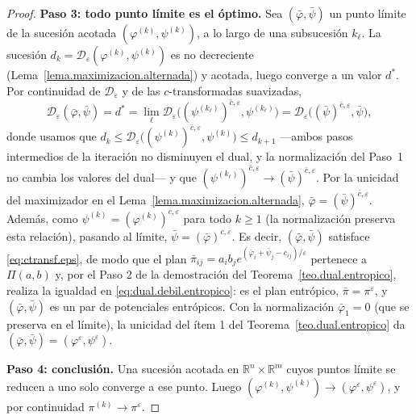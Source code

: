 \documentclass[12pt, a4paper]{amsbook}
\newcommand{\R}{{\mathbb R}}
\theoremstyle{remark}
\theoremstyle{definition}
\numberwithin{section}{chapter}
\numberwithin{subsection}{section}
\numberwithin{equation}{section}
\numberwithin{figure}{chapter}
\begin{document}
\begin{proof}
\medskip
\textbf{Paso 3: todo punto límite es el óptimo.} Sea
$(\bar\varphi,\bar\psi)$ un punto límite de la sucesión acotada
$(\varphi^{(k)},\psi^{(k)})$, a lo largo de una subsucesión $k_\ell$. La
sucesión $d_k=\mathcal D_\varepsilon(\varphi^{(k)},\psi^{(k)})$ es no
decreciente (Lema~\ref{lema.maximizacion.alternada}) y acotada, luego
converge a un valor $d^*$. Por continuidad de $\mathcal D_\varepsilon$ y de las
$c$-transformadas suavizadas,
\[
\mathcal D_\varepsilon(\bar\varphi,\bar\psi)=d^*
=\lim_\ell\mathcal D_\varepsilon\bigl((\psi^{(k_\ell)})^{\bar c,\varepsilon},\psi^{(k_\ell)}\bigr)
=\mathcal D_\varepsilon\bigl((\bar\psi)^{\bar c,\varepsilon},\bar\psi\bigr),
\]
donde usamos que
$d_k\le\mathcal D_\varepsilon\bigl((\psi^{(k)})^{\bar c,\varepsilon},\psi^{(k)}\bigr)\le d_{k+1}$
—ambos pasos intermedios de la iteración no disminuyen el dual, y la
normalización del Paso~1 no cambia los valores del dual— y que
$(\psi^{(k_\ell)})^{\bar c,\varepsilon}\to(\bar\psi)^{\bar c,\varepsilon}$.
Por la unicidad del maximizador en el Lema~\ref{lema.maximizacion.alternada},
$\bar\varphi=(\bar\psi)^{\bar c,\varepsilon}$. Además, como
$\psi^{(k)}=(\varphi^{(k)})^{c,\varepsilon}$ para todo $k\ge1$ (la
normalización preserva esta relación), pasando al límite,
$\bar\psi=(\bar\varphi)^{c,\varepsilon}$. Es decir, $(\bar\varphi,\bar\psi)$
satisface \eqref{eq:ctransf.eps}, de modo que el plan
$\bar\pi_{ij}=a_ib_je^{(\bar\varphi_i+\bar\psi_j-c_{ij})/\varepsilon}$
pertenece a $\Pi(a,b)$ y, por el Paso 2 de la demostración del
Teorema~\ref{teo.dual.entropico}, realiza la igualdad en
\eqref{eq:dual.debil.entropico}: es el plan entrópico, $\bar\pi=\pi^\varepsilon$,
y $(\bar\varphi,\bar\psi)$ es un par de potenciales entrópicos. Con la
normalización $\bar\varphi_1=0$ (que se preserva en el límite), la unicidad
del ítem 1 del Teorema~\ref{teo.dual.entropico} da
$(\bar\varphi,\bar\psi)=(\varphi^\varepsilon,\psi^\varepsilon)$.

\medskip
\textbf{Paso 4: conclusión.} Una sucesión acotada en $\R^n\times\R^m$ cuyos
puntos límite se reducen a uno solo converge a ese punto. Luego
$(\varphi^{(k)},\psi^{(k)})\to(\varphi^\varepsilon,\psi^\varepsilon)$, y por
continuidad $\pi^{(k)}\to\pi^\varepsilon$.
\end{proof}
\end{document}
